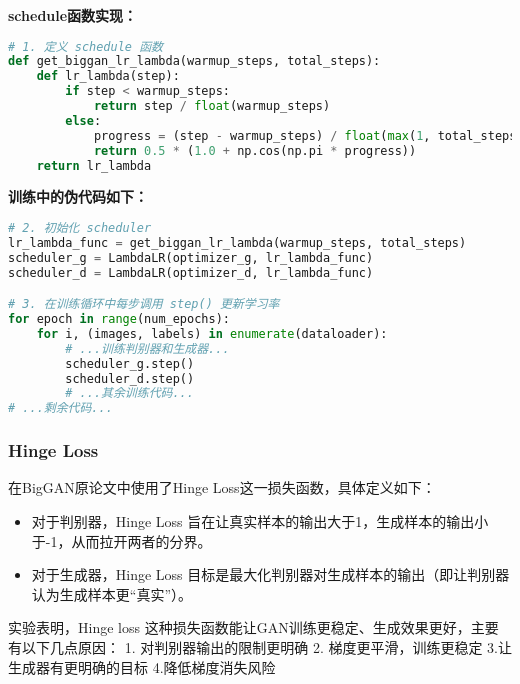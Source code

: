 \documentclass[12pt, a4paper]{article}
\begin{document}
\vspace{0.5cm}
\noindent\textbf{schedule函数实现：}
\begin{lstlisting}[language=Python]
# 1. 定义 schedule 函数
def get_biggan_lr_lambda(warmup_steps, total_steps):
    def lr_lambda(step):
        if step < warmup_steps:
            return step / float(warmup_steps)
        else:
            progress = (step - warmup_steps) / float(max(1, total_steps - warmup_steps))
            return 0.5 * (1.0 + np.cos(np.pi * progress))
    return lr_lambda
\end{lstlisting}
\vspace{0.5cm}
\noindent\textbf{训练中的伪代码如下：}
\begin{lstlisting}[language=Python]
# 2. 初始化 scheduler
lr_lambda_func = get_biggan_lr_lambda(warmup_steps, total_steps)
scheduler_g = LambdaLR(optimizer_g, lr_lambda_func)
scheduler_d = LambdaLR(optimizer_d, lr_lambda_func)

# 3. 在训练循环中每步调用 step() 更新学习率
for epoch in range(num_epochs):
    for i, (images, labels) in enumerate(dataloader):
        # ...训练判别器和生成器...
        scheduler_g.step()
        scheduler_d.step()
        # ...其余训练代码...
# ...剩余代码...
\end{lstlisting}

\subsubsection{Hinge Loss}
在BigGAN原论文中使用了Hinge Loss这一损失函数，具体定义如下：
\begin{itemize}
    \item 对于判别器，Hinge Loss 旨在让真实样本的输出大于1，生成样本的输出小于-1，从而拉开两者的分界。
    \item 对于生成器，Hinge Loss 目标是最大化判别器对生成样本的输出（即让判别器认为生成样本更“真实”）。
\end{itemize}

实验表明，Hinge loss 这种损失函数能让GAN训练更稳定、生成效果更好，主要有以下几点原因：
1. 对判别器输出的限制更明确 2. 梯度更平滑，训练更稳定 3.让生成器有更明确的目标 4.降低梯度消失风险
\end{document}
